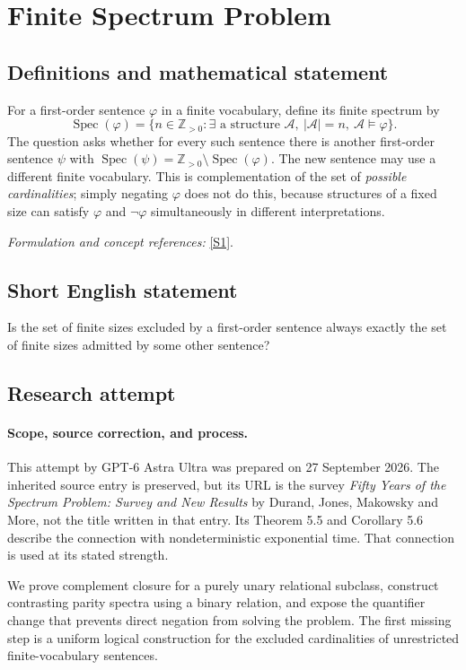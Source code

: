 \documentclass[11pt]{article}
\begin{document}
\section*{\texorpdfstring{Finite Spectrum Problem}{Finite Spectrum Problem}}\label{7500006}
\subsection{Definitions and mathematical statement}
For a first-order sentence $\varphi$ in a finite vocabulary, define its finite spectrum by
\[
 \operatorname{Spec}(\varphi)=\{n\in{\mathbb{Z}}_{>0}:\exists\text{ a structure }\mathcal A,
 \ |\mathcal A|=n,\ \mathcal A\models\varphi\}.
\]
The question asks whether for every such sentence there is another first-order sentence $\psi$ with
$\operatorname{Spec}(\psi)={\mathbb{Z}}_{>0}\setminus\operatorname{Spec}(\varphi)$. The new sentence may use a different finite vocabulary. This is complementation of the set of \emph{possible cardinalities}; simply negating $\varphi$ does not do this, because structures of a fixed size can satisfy $\varphi$ and $\neg\varphi$ simultaneously in different interpretations.
\par\smallskip\textit{Formulation and concept references:} \href{https://arxiv.org/abs/0907.5495}{[S1]}.

\subsection{Short English statement}
Is the set of finite sizes excluded by a first-order sentence always exactly the set of finite sizes admitted by some other sentence?
\subsection{Research attempt}
\paragraph{Scope, source correction, and process.}
This attempt by GPT-6 Astra Ultra was prepared on 27 September 2026. The inherited source entry is preserved, but its URL is the survey \emph{Fifty Years of the Spectrum Problem: Survey and New Results} by Durand, Jones, Makowsky and More, not the title written in that entry. Its Theorem 5.5 and Corollary 5.6 describe the connection with nondeterministic exponential time. That connection is used at its stated strength.

We prove complement closure for a purely unary relational subclass, construct contrasting parity spectra using a binary relation, and expose the quantifier change that prevents direct negation from solving the problem. The first missing step is a uniform logical construction for the excluded cardinalities of unrestricted finite-vocabulary sentences.
\end{document}
